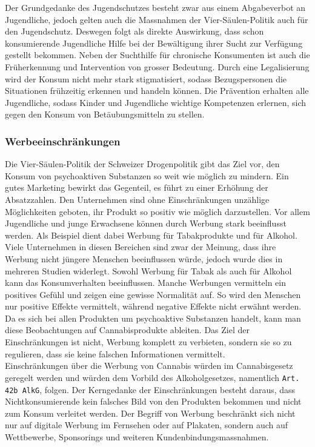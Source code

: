 \documentclass[../main.tex]{subfiles}
\begin{document}
	 \noindent
	 Der Grundgedanke des Jugendschutzes besteht zwar aus einem Abgabeverbot an Jugendliche, jedoch gelten auch die Massnahmen der Vier-Säulen-Politik auch für den Jugendschutz. 
	 Deswegen folgt als direkte Auswirkung, dass schon konsumierende Jugendliche Hilfe bei der Bewältigung ihrer Sucht zur Verfügung gestellt bekommen. 
	 Neben der Suchthilfe für chronische Konsumenten ist auch die Früherkennung und Intervention von grosser Bedeutung. 
	 Durch eine Legalisierung wird der Konsum nicht mehr stark stigmatisiert, sodass Bezugspersonen die Situationen frühzeitig erkennen und handeln können. 
	 Die Prävention erhalten alle Jugendliche, sodass Kinder und Jugendliche wichtige Kompetenzen erlernen, sich gegen den Konsum von Betäubungsmitteln zu stellen.  
	 
	 \subsubsection{Werbeeinschränkungen}
	 Die Vier-Säulen-Politik der Schweizer Drogenpolitik gibt das Ziel vor, den Konsum von psychoaktiven Substanzen so weit wie möglich zu mindern.
	 Ein gutes Marketing bewirkt das Gegenteil, es führt zu einer Erhöhung der Absatzzahlen.
	 Den Unternehmen sind ohne Einschränkungen unzählige Möglichkeiten geboten, ihr Produkt so positiv wie möglich darzustellen.	 
	 Vor allem Jugendliche und junge Erwachsene können durch Werbung stark beeinflusst werden.
	 Als Beispiel dient dabei Werbung für Tabakprodukte und für Alkohol.
	 Viele Unternehmen in diesen Bereichen sind zwar der Meinung, dass ihre Werbung nicht jüngere Menschen beeinflussen würde, jedoch wurde dies in mehreren Studien widerlegt.
	 Sowohl Werbung für Tabak \cite{lovato} als auch für Alkohol \cite{jernigan} kann das Konsumverhalten beeinflussen.
	 Manche Werbungen vermitteln ein positives Gefühl und zeigen eine gewisse Normalität auf. 
	 So wird den Menschen nur positive Effekte vermittelt, während negative Effekte nicht erwähnt werden.
	 Da es sich bei allen Produkten um psychoaktive Substanzen handelt, kann man diese Beobachtungen auf Cannabisprodukte ableiten.
	 Das Ziel der Einschränkungen ist nicht, Werbung komplett zu verbieten, sondern sie so zu regulieren, dass sie keine falschen Informationen vermittelt.\\
	 
	 \noindent	 
	 Einschränkungen über die Werbung von Cannabis würden im Cannabisgesetz geregelt werden und würden dem Vorbild des Alkoholgesetzes, namentlich \texttt{Art. 42b AlkG}, folgen.
	 Der Kerngedanke der Einschränkungen besteht daraus, dass Nichtkonsumierende kein falsches Bild von den Produkten bekommen und nicht zum Konsum verleitet werden.
	 Der Begriff von Werbung beschränkt sich nicht nur auf digitale Werbung im Fernsehen oder auf Plakaten, sondern auch auf Wettbewerbe, Sponsorings und weiteren Kundenbindungsmassnahmen.
	 
\end{document}
